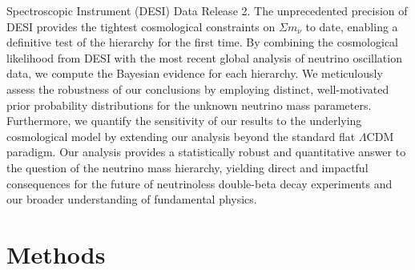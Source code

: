 \documentclass[]{article}
\begin{document}
Spectroscopic Instrument (DESI) Data Release 2. The unprecedented precision of DESI provides the tightest cosmological constraints on $\Sigma m_\nu$ to date, enabling a definitive test of the hierarchy for the first time. By combining the cosmological likelihood from DESI with the most recent global analysis of neutrino oscillation data, we compute the Bayesian evidence for each hierarchy. We meticulously assess the robustness of our conclusions by employing distinct, well-motivated prior probability distributions for the unknown neutrino mass parameters. Furthermore, we quantify the sensitivity of our results to the underlying cosmological model by extending our analysis beyond the standard flat $\Lambda$CDM paradigm. Our analysis provides a statistically robust and quantitative answer to the question of the neutrino mass hierarchy, yielding direct and impactful consequences for the future of neutrinoless double-beta decay experiments and our broader understanding of fundamental physics.

\section{Methods}
\label{sec:methods}
\end{document}
